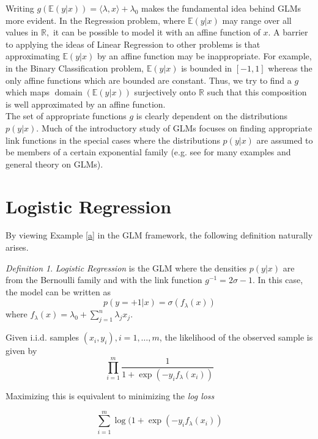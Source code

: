 \documentclass[BSc]{usydthesis}
\numberwithin{equation}{chapter}
\theoremstyle{remark}
\newtheorem{Definition}[equation]{Definition}
\newcommand{\la}{\lambda}
\begin{document}
Writing $g\left(\mathbb{E}(y|x)\right) =\langle \la, x \rangle + \la_0$ makes the fundamental idea behind GLMs more evident. In the Regression problem, where $\mathbb{E}(y|x)$ may range over all values in $\mathbb{R},$ it can be possible to model it with an affine function of $x.$ A barrier to applying the ideas of Linear Regression to other problems is that approximating $\mathbb{E}(y|x)$ by an affine function may be inappropriate. For example, in the Binary Classification problem, $\mathbb{E}(y|x)$ is bounded in $[-1,1]$ whereas the only affine functions which are bounded are constant. Thus, we try to find a $g$ which maps $\operatorname{domain}(\mathbb{E}(y|x))$ surjectively onto $\mathbb{R}$ such that this composition is well approximated by an affine function.\\

The set of appropriate functions $g$ is clearly dependent on the distributions $p(y|x).$ Much of the introductory study of GLMs focuses on finding appropriate link functions in the special cases where the distributions $p(y|x)$ are assumed to be members of a certain exponential family (e.g. see \cite{GLM} for many examples and general theory on GLMs).\\

\section{Logistic Regression}

By viewing Example \ref{a} in the GLM framework, the following definition naturally arises. 

\begin{Definition}
 {\em Logistic Regression} is the GLM where the densities $p(y|x)$ are from the Bernoulli family and with the link function $g^{-1} = 2 \sigma -1.$ In this case, the model can be written as $$p(y=+1|x) = \sigma(f_{\la}(x))$$ where $f_{\la}(x) = \la_0 + \sum_{j=1}^n \la_j x_j.$ 
\end{Definition}


Given i.i.d. samples $(x_i, y_i), i=1,\ldots, m$, the likelihood of the observed sample is given by $$ \prod_{i=1}^m \frac{1}{1+\exp(-y_i f_{\la}(x_i))}$$

Maximizing this is equivalent to minimizing the {\em log loss} 

$$ \sum_{i=1}^m \log(1+ \exp(-y_i f_{\la}(x_i))$$
\end{document}
